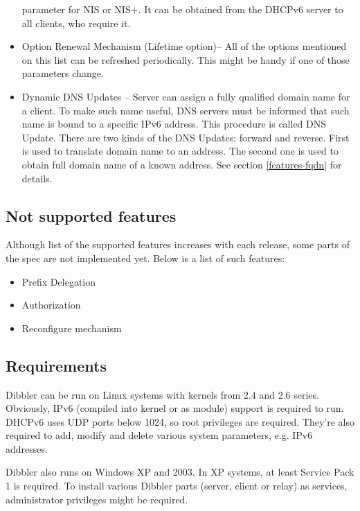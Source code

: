 \begin{itemize}
      parameter for NIS or NIS+. It can be obtained from the DHCPv6
      server to all clients, who require it. \cite{rfc3898}
\item Option Renewal Mechanism (Lifetime option)-- All of the options
      mentioned on this list can be refreshed periodically. This might
      be handy if one of those parameters change. \cite{draft-lifetime}
\item Dynamic DNS Updates -- Server can assign a fully qualified
      domain name for a client. To make such name useful, DNS servers
      must be informed that such name is bound to a specific IPv6
      address. This procedure is called DNS Update. There are two kinds
      of the DNS Updates: forward and reverse. First is used to
      translate domain name to an address. The second one is used to
      obtain full domain name of a known address. See section
      \ref{features-fqdn} for details. \cite{draft-fqdn}
\end{itemize}

\subsection{Not supported features}
Although list of the supported features increases with each release,
some parts of the spec are not implemented yet. Below is a list of such
features:

\begin{itemize}
 \item Prefix Delegation \cite{prefix-del}
 \item Authorization \cite{rfc3315}
 \item Reconfigure mechanism \cite{rfc3315}
\end{itemize}

\subsection{Requirements}
Dibbler can be run on Linux systems with kernels from 2.4 and 2.6
series. Obviously, IPv6 (compiled into kernel or as module) support is
required to run. DHCPv6 uses UDP ports below 1024, so root privileges
are required. They're also required to add, modify and delete various
system parameters, e.g. IPv6 addresses.

Dibbler also runs on Windows XP and 2003. In XP systems, at least
Service Pack 1 is required. To install various Dibbler parts (server,
client or relay) as services, administrator privileges might be
required. 

